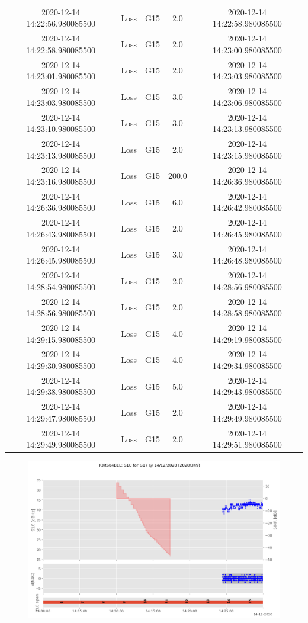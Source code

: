 \begin{enumerate}
\begin{longtabu}{ccccc}
2020{-}12{-}14 14:22:56.980085500&Loss&G15&2.0&2020{-}12{-}14 14:22:58.980085500\\%
2020{-}12{-}14 14:22:58.980085500&Loss&G15&2.0&2020{-}12{-}14 14:23:00.980085500\\%
2020{-}12{-}14 14:23:01.980085500&Loss&G15&2.0&2020{-}12{-}14 14:23:03.980085500\\%
2020{-}12{-}14 14:23:03.980085500&Loss&G15&3.0&2020{-}12{-}14 14:23:06.980085500\\%
2020{-}12{-}14 14:23:10.980085500&Loss&G15&3.0&2020{-}12{-}14 14:23:13.980085500\\%
2020{-}12{-}14 14:23:13.980085500&Loss&G15&2.0&2020{-}12{-}14 14:23:15.980085500\\%
2020{-}12{-}14 14:23:16.980085500&Loss&G15&200.0&2020{-}12{-}14 14:26:36.980085500\\%
2020{-}12{-}14 14:26:36.980085500&Loss&G15&6.0&2020{-}12{-}14 14:26:42.980085500\\%
2020{-}12{-}14 14:26:43.980085500&Loss&G15&2.0&2020{-}12{-}14 14:26:45.980085500\\%
2020{-}12{-}14 14:26:45.980085500&Loss&G15&3.0&2020{-}12{-}14 14:26:48.980085500\\%
2020{-}12{-}14 14:28:54.980085500&Loss&G15&2.0&2020{-}12{-}14 14:28:56.980085500\\%
2020{-}12{-}14 14:28:56.980085500&Loss&G15&2.0&2020{-}12{-}14 14:28:58.980085500\\%
2020{-}12{-}14 14:29:15.980085500&Loss&G15&4.0&2020{-}12{-}14 14:29:19.980085500\\%
2020{-}12{-}14 14:29:30.980085500&Loss&G15&4.0&2020{-}12{-}14 14:29:34.980085500\\%
2020{-}12{-}14 14:29:38.980085500&Loss&G15&5.0&2020{-}12{-}14 14:29:43.980085500\\%
2020{-}12{-}14 14:29:47.980085500&Loss&G15&2.0&2020{-}12{-}14 14:29:49.980085500\\%
2020{-}12{-}14 14:29:49.980085500&Loss&G15&2.0&2020{-}12{-}14 14:29:51.980085500\\%
\hline%
\end{longtabu}%


\begin{figure}[H]%
\centering%
\includegraphics[width=0.95\linewidth]{png/P3RS04BEL_R_20203490000_01D_00U_MO_G-S1C-G17.png}%
\end{figure}


\end{enumerate}

